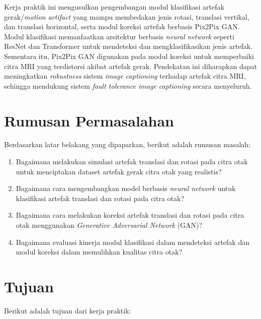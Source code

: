 Kerja praktik ini mengusulkan pengembangan modul klasifikasi artefak gerak/\textit{motion artifact} yang mampu membedakan jenis rotasi, translasi vertikal, dan translasi horizontal, serta modul koreksi artefak berbasis Pix2Pix GAN. Modul klasifikasi memanfaatkan arsitektur berbasis \textit{neural network} seperti ResNet dan Transformer untuk mendeteksi dan mengklasifikasikan jenis artefak. Sementara itu, Pix2Pix GAN digunakan pada modul koreksi untuk memperbaiki citra MRI yang terdistorsi akibat artefak gerak. Pendekatan ini diharapkan dapat meningkatkan \textit{robustness} sistem \textit{image captioning} terhadap artefak citra MRI, sehingga mendukung sistem \textit{fault tolerance image captioning} secara menyeluruh.

\section{Rumusan Permasalahan}

Berdasarkan latar belakang yang dipaparkan, berikut adalah rumusan masalah:

\begin{enumerate}[nolistsep]

  \item Bagaimana melakukan simulasi artefak translasi dan rotasi pada citra otak untuk menciptakan dataset artefak gerak citra otak yang realistis?
  
  \item Bagaimana cara mengembangkan model berbasis \textit{neural network} untuk klasifikasi artefak translasi dan rotasi pada citra otak?  

  \item Bagaimana cara melakukan koreksi artefak translasi dan rotasi pada citra otak menggunakan \textit{Generative Adversarial Network} (GAN)? 
  
  \item Bagaimana evaluasi kinerja modul klasifikasi dalam mendeteksi artefak dan modul koreksi dalam memulihkan kualitas citra otak?

\end{enumerate}

\section{Tujuan}

Berikut adalah tujuan dari kerja praktik:


